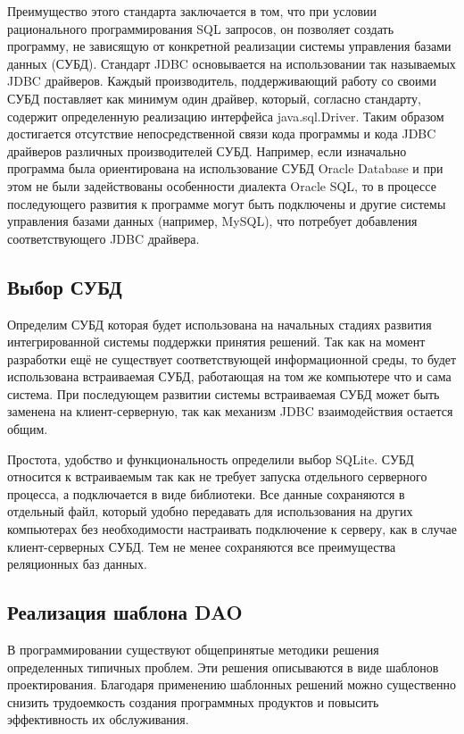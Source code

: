 \documentclass[14pt,oneside,final]{extreport}
\begin{document}
	Преимущество этого стандарта заключается в том, что при условии рационального программирования SQL запросов, он позволяет создать программу, не зависящую от конкретной реализации системы управления базами данных (СУБД). Стандарт JDBC основывается на использовании так называемых JDBC драйверов. Каждый производитель, поддерживающий работу со своими СУБД поставляет как минимум один драйвер, который, согласно стандарту, содержит определенную реализацию интерфейса java.sql.Driver. Таким образом достигается отсутствие непосредственной связи кода программы и кода JDBC драйверов различных производителей СУБД. Например, если изначально программа была ориентирована на использование СУБД Oracle Database и при этом не были задействованы особенности диалекта Oracle SQL, то в процессе последующего развития к программе могут быть подключены и другие системы управления базами данных (например, MySQL), что потребует добавления соответствующего JDBC драйвера. 
	
	\subsection{Выбор СУБД}
	Определим СУБД которая будет использована на начальных стадиях развития интегрированной системы поддержки принятия решений. Так как на момент разработки ещё не существует соответствующей информационной среды, то будет использована встраиваемая СУБД, работающая на том же компьютере что и сама система. При последующем развитии системы встраиваемая СУБД может быть заменена на клиент-серверную, так как механизм JDBC взаимодействия остается общим. 
	
	Простота, удобство и функциональность определили выбор SQLite. СУБД относится к встраиваемым так как не требует запуска отдельного серверного процесса, а подключается в виде библиотеки. Все данные сохраняются в отдельный файл, который удобно передавать для использования на других компьютерах без необходимости настраивать подключение к серверу, как в случае клиент-серверных СУБД. Тем не менее сохраняются все преимущества реляционных баз данных. 
	
	\subsection{Реализация шаблона DAO}
	В программировании существуют общепринятые методики решения определенных типичных проблем. Эти решения описываются в виде шаблонов проектирования. Благодаря применению шаблонных решений можно существенно снизить трудоемкость создания программных продуктов и повысить эффективность их обслуживания. 
	
\end{document}
